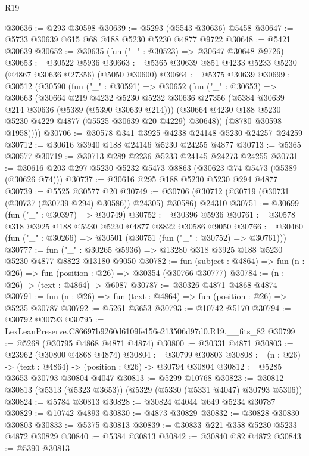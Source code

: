 \begin{lexlean}{R19}
\begin{coremodule}
@30636 := @293 @30598
@30639 := @5293 (@5543 @30636) @5458
@30647 := @5733 @30639 @615 @68 @188 @5230 @5230 @4877 @9722
@30648 := @5421 @30639
@30652 := @30635 (fun ("_" : @30523) => @30647 @30648 @9726)
@30653 := @30522 @5936
@30663 := @5365 @30639 @851 @4233 @5233 @5230 (@4867 @30636 @27356) (@5050 @30600)
@30664 := @5375 @30639
@30699 := @30512
    (@30590
      (fun ("_" : @30591) =>
      @30652
        (fun ("_" : @30653) =>
        @30663
          (@30664
            @219
            @4232
            @5230
            @5232
            @30636
            @27356
            (@5384 @30639 @214 @30636 (@5389 (@5390 @30639 @214)))
            (@30664 @4230 @188 @5230 @5230 @4229 @4877 (@5525 @30639 @20 @4229) @30648))
          (@8780 @30598 @1958))))
@30706 := @30578 @341 @3925 @4238 @24148 @5230 @24257 @24259
@30712 := @30616 @3940 @188 @24146 @5230 @24255 @4877
@30713 := @5365 @30577
@30719 := @30713 @289 @2236 @5233 @24145 @24273 @24255
@30731 := @30616 @203 @297 @5230 @5232 @5473 @8863 (@30623 @74 @5473 (@5389 (@30626 @74)))
@30737 := @30616 @295 @188 @5230 @5230 @294 @4877
@30739 := @5525 @30577 @20
@30749 := @30706 (@30712 (@30719 (@30731 (@30737 (@30739 @294) @30586)) @24305) @30586) @24310
@30751 := @30699 (fun ("_" : @30397) => @30749)
@30752 := @30396 @5936
@30761 := @30578 @318 @3925 @188 @5230 @5230 @4877 @8822 @30586 @9050
@30766 := @30460 (fun ("_" : @30266) => @30501 (@30751 (fun ("_" : @30752) => @30761)))
@30777 := fun ("_" : @30265 @5936) => @13280 @318 @3925 @188 @5230 @5230 @4877 @8822 @13180 @9050
@30782 := fun (subject : @4864) => fun (n : @26) => fun (position : @26) => @30354 (@30766 @30777)
@30784 := (n : @26) -> (text : @4864) -> @6087
@30787 := @30326 @4871 @4868 @4874
@30791 := fun (n : @26) => fun (text : @4864) => fun (position : @26) => @5235 @30787
@30792 := @5261 @3653
@30793 := @10742 @5170
@30794 := @30792 @30793
@30795 := LexLeanPreserve.C86697b9260d6109fe156e213506d97d0.R19.__fits_82
@30799 := @5268 (@30795 @4868 @4871 @4874)
@30800 := @30331 @4871
@30803 := @23962 (@30800 @4868 @4874)
@30804 := @30799 @30803
@30808 := (n : @26) -> (text : @4864) -> (position : @26) -> @30794 @30804
@30812 := @5285 @3653 @30793 @30804 @4047
@30813 := @5299 @10768
@30823 := @30812 @30813 (@5313 (@5323 @3653)) (@5329 (@5330 (@5331 @4047) @30793 @5306))
@30824 := @5784 @30813
@30828 := @30824 @4044 @649 @5234 @30787
@30829 := @10742 @4893
@30830 := @4873 @30829
@30832 := @30828 @30830 @30803
@30833 := @5375 @30813
@30839 := @30833 @221 @358 @5230 @5233 @4872 @30829
@30840 := @5384 @30813
@30842 := @30840 @82 @4872
@30843 := @5390 @30813

\end{coremodule}
\end{lexlean}
